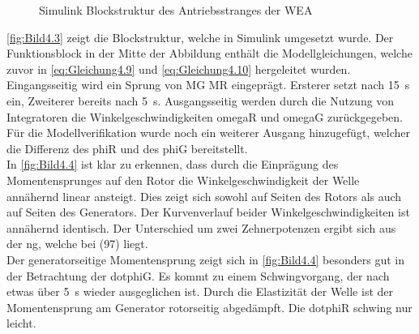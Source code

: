 \begin{figure}[H]
   \centering
   \caption[Antriebsstrang Simulink]{Simulink Blockstruktur des Antriebsstranges der WEA}
   \label{fig:Bild4.3}
\end{figure}

\autoref{fig:Bild4.3} zeigt die Blockstruktur, welche in Simulink umgesetzt wurde. Der Funktionsblock in der Mitte der Abbildung enthält die Modellgleichungen, welche zuvor in \autoref{eq:Gleichung4.9} und \autoref{eq:Gleichung4.10} hergeleitet wurden. Eingangsseitig wird ein Sprung von \acs{MG} \bzw \acs{MR} eingeprägt. Ersterer setzt nach \SI{15}{s} ein, Zweiterer bereits nach \SI{5}{s}. Ausgangsseitig werden durch die Nutzung von Integratoren die Winkelgeschwindigkeiten \acs{omegaR} und \acs{omegaG} zurückgegeben. Für die Modellverifikation wurde noch ein weiterer Ausgang hinzugefügt, welcher die Differenz des \ac{phiR} und des \ac{phiG} bereitstellt. \\

In \autoref{fig:Bild4.4} ist klar zu erkennen, dass durch die Einprägung des Momentensprunges auf den Rotor die Winkelgeschwindigkeit der Welle annähernd linear ansteigt. Dies zeigt sich sowohl auf Seiten des Rotors als auch auf Seiten des Generators. Der Kurvenverlauf beider Winkelgeschwindigkeiten ist annähernd identisch. Der Unterschied um zwei Zehnerpotenzen ergibt sich aus der \acf{ng}, welche bei  (97) liegt.\\
Der generatorseitige Momentensprung zeigt sich in \autoref{fig:Bild4.4} besonders gut in der Betrachtung der \ac{dotphiG}. Es kommt zu einem Schwingvorgang, der nach etwas über \SI{5}{s} wieder ausgeglichen ist. Durch die Elastizität der Welle ist der Momentensprung am Generator rotorseitig abgedämpft. Die \ac{dotphiR} schwing nur leicht.

